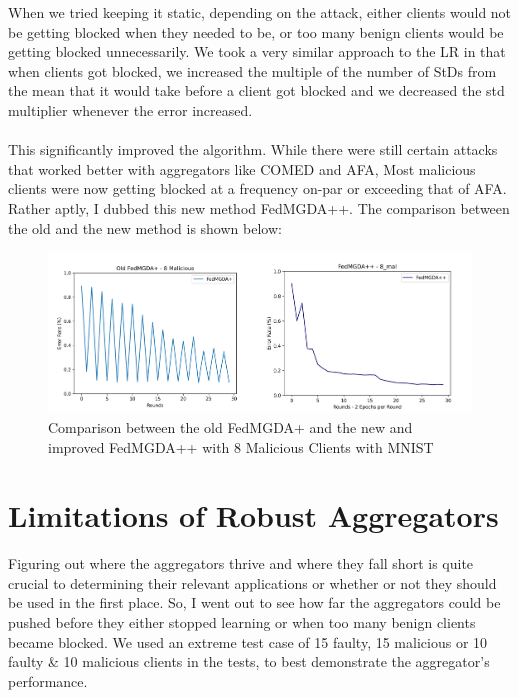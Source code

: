 When we tried keeping it static, depending on the attack, either clients would not be getting blocked when they needed to be, or too many benign clients would be getting blocked unnecessarily. 
We took a very similar approach to the LR in that when clients got blocked, we increased the multiple of the number of StDs from the mean that it would take before a client got blocked and we decreased the std multiplier whenever the error increased.
\\ \\
This significantly improved the algorithm. While there were still certain attacks that worked better with aggregators like COMED and AFA, Most malicious clients were now getting blocked at a frequency on-par or exceeding that of AFA.
Rather aptly, I dubbed this new method FedMGDA++.
The comparison between the old and the new method is shown below:
\begin{figure}[htbp]
    \centering
    \includegraphics[scale=0.12]{initial/graphs/fedmgda_comp.png}
    \caption{Comparison between the old FedMGDA+ and the new and improved FedMGDA++ with 8 Malicious Clients with MNIST}
    \label{fig:fedmgda_comp}
\end{figure}

\section{Limitations of Robust Aggregators}
Figuring out where the aggregators thrive and where they fall short is quite crucial to determining their relevant applications or whether or not they should be used in the first place.
So, I went out to see how far the aggregators could be pushed before they either stopped learning or when too many benign clients became blocked.
We used an extreme test case of 15 faulty, 15 malicious or 10 faulty \& 10 malicious clients in the tests, to best demonstrate the aggregator's performance.


